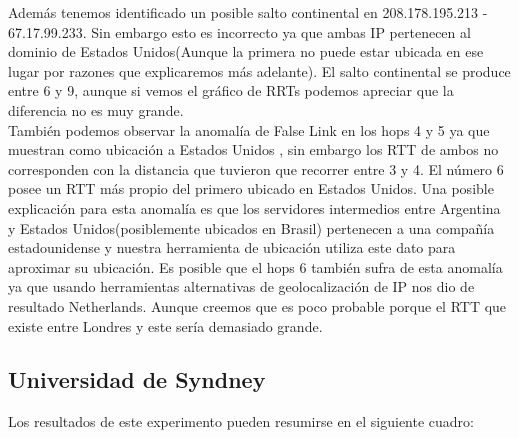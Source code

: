 Además tenemos identificado un posible salto continental en 208.178.195.213 - 67.17.99.233.
Sin embargo esto es incorrecto ya que ambas IP pertenecen al dominio de Estados Unidos(Aunque la primera no puede estar ubicada
en ese lugar por razones que explicaremos más adelante). El salto continental se produce entre 6 y 9, aunque
si vemos el gráfico de RRTs podemos apreciar que la diferencia no es muy grande.\\

También podemos observar la anomalía de False Link en los hops 4 y 5 ya que muestran como ubicación a Estados Unidos
, sin embargo los RTT de ambos no corresponden con la distancia que tuvieron que recorrer entre 3 y 4. El número 6
posee un RTT más propio del primero ubicado en Estados Unidos. Una posible explicación para esta anomalía es que
los servidores intermedios entre Argentina y Estados Unidos(posiblemente ubicados en Brasil) pertenecen a una
compañía estadounidense y nuestra herramienta de ubicación utiliza este dato para aproximar su ubicación. Es posible
que el hops 6 también sufra de esta anomalía ya que usando herramientas alternativas de geolocalización de IP nos dio
de resultado Netherlands. Aunque creemos que es poco probable porque el RTT que existe entre Londres y este sería demasiado
grande.

\newpage

\subsection{Universidad de Syndney}

Los resultados de este experimento pueden resumirse en el siguiente cuadro:

